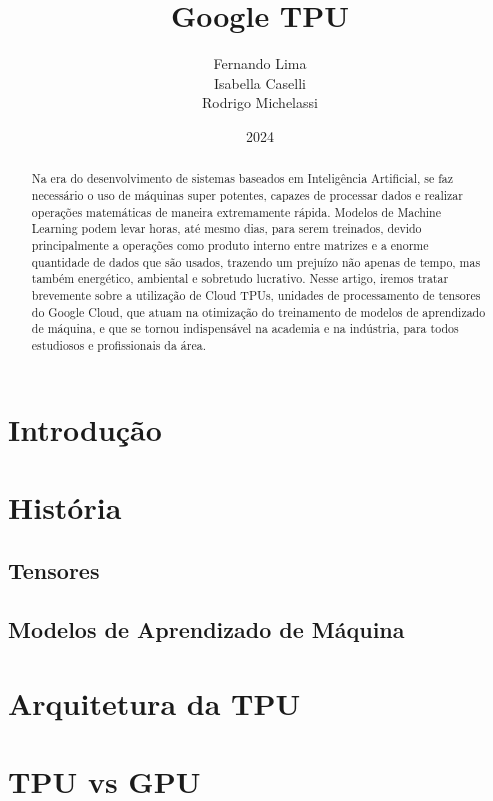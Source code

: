 \documentclass{report}
\title{Google TPU}
\author{Fernando Lima \\ Isabella Caselli \\ Rodrigo Michelassi}
\date{2024}
\begin{document}
\maketitle
\tableofcontents	%

\begin{abstract}
Na era do desenvolvimento de sistemas baseados em Inteligência Artificial, se faz necessário o uso de máquinas super potentes, capazes de processar dados e realizar operações matemáticas de maneira extremamente rápida. Modelos de Machine Learning podem levar horas, até mesmo dias, para serem treinados, devido principalmente a operações como produto interno entre matrizes e a enorme quantidade de dados que são usados, trazendo um prejuízo não apenas de tempo, mas também energético, ambiental e sobretudo lucrativo. Nesse artigo, iremos tratar brevemente sobre a utilização de Cloud TPUs, unidades de processamento de tensores do Google Cloud, que atuam na otimização do treinamento de modelos de aprendizado de máquina, e que se tornou indispensável na academia e na indústria, para todos estudiosos e profissionais da área.
\end{abstract}

\chapter{Introdução}

\chapter{História}

\section{Tensores}

\section{Modelos de Aprendizado de Máquina}

\chapter{Arquitetura da TPU}

\chapter{TPU vs GPU}
\end{document}
